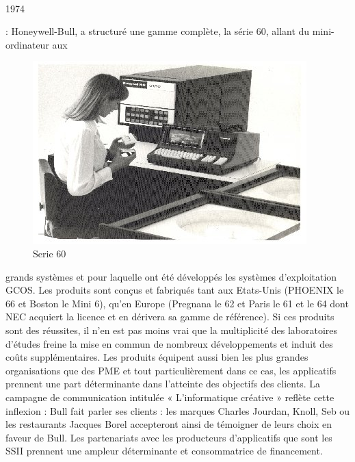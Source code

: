 \documentclass{article}
\begin{document}
		\paragraph{}
		\begin{bf}1974\end{bf}: Honeywell-Bull, a structuré une gamme complète, la série 60, allant du mini-ordinateur aux 
		\begin{figure}
		\includegraphics[scale=1]{serie_60.jpg}
		\caption{Serie 60}
		\end{figure} 
		grands systèmes et pour laquelle ont été développés les systèmes d’exploitation GCOS. Les produits sont conçus et 
		fabriqués tant aux Etats-Unis (PHOENIX le 66 et Boston le Mini 6), qu’en Europe (Pregnana le 62 et Paris le 61 et le 
		64 dont NEC acquiert la licence et en dérivera sa gamme de référence). Si ces produits sont des réussites, il n’en est 
		pas moins vrai que la multiplicité des laboratoires d’études freine la mise en commun de nombreux développements et 
		induit des coûts supplémentaires. Les produits équipent aussi bien les plus grandes organisations que des PME et tout 
		particulièrement dans ce cas, les applicatifs prennent une part déterminante dans l’atteinte des objectifs des clients.\newline{}
		La campagne de communication intitulée « L’informatique créative » reflète cette inflexion : Bull fait parler ses 
		clients : les marques Charles Jourdan, Knoll, Seb ou les restaurants Jacques Borel accepteront ainsi de témoigner de 
		leurs choix en faveur de Bull. Les partenariats avec les producteurs d’applicatifs que sont les SSII prennent une 
		ampleur déterminante et consommatrice de financement.
\end{document}
